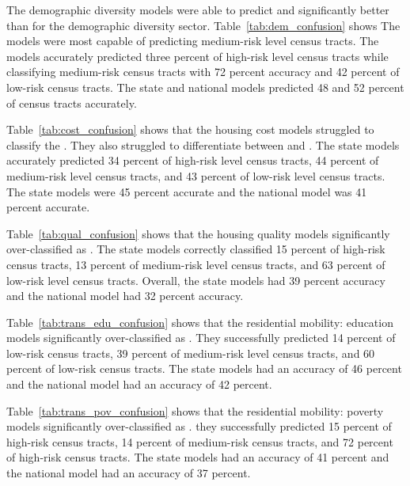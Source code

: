The demographic diversity models were able to predict \mrls and \lrls significantly better than \hrls for the demographic diversity sector.  Table~\ref{tab:dem_confusion} shows The models were most capable of predicting medium-risk level census tracts. The models accurately predicted three percent of high-risk level census tracts while classifying medium-risk census tracts with 72 percent accuracy and 42 percent of low-risk census tracts. The state and national models predicted 48 and 52 percent of census tracts accurately. 

 

Table~\ref{tab:cost_confusion} shows that the housing cost models struggled to classify the \lrl \cts. They also struggled to differentiate between \mrl and \hrl \cts. The state models accurately predicted 34 percent of high-risk level census tracts, 44 percent of medium-risk level census tracts, and 43 percent of low-risk level census tracts. The state models were 45 percent accurate and the national model was 41 percent accurate. 

 

Table~\ref{tab:qual_confusion} shows that the housing quality models significantly over-classified \cts as \lrl. The state models correctly classified 15 percent of high-risk census tracts, 13 percent of medium-risk level census tracts, and 63 percent of low-risk level census tracts. Overall, the state models had 39 percent accuracy and the national model had 32 percent accuracy. 

 

Table~\ref{tab:trans_edu_confusion} shows that the residential mobility: education models significantly over-classified \cts as \lrl. They successfully predicted 14 percent of low-risk census tracts, 39 percent of medium-risk level census tracts, and  60 percent of low-risk census tracts. The state models had an accuracy of 46 percent and the national model had an accuracy of 42 percent.

 

Table~\ref{tab:trans_pov_confusion} shows that the residential mobility: poverty models significantly over-classified \cts as \lrl. they successfully predicted 15 percent of high-risk census tracts, 14 percent of medium-risk census tracts, and 72 percent of high-risk census tracts. The state models had an accuracy of 41 percent and the national model had an accuracy of 37 percent. 

